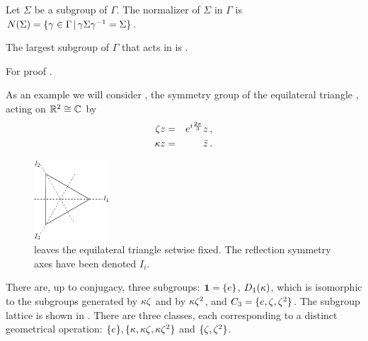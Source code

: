 \begin{definition}
 Let $\Sigma$ be a subgroup of $\Gamma$. The normalizer of $\Sigma$ in $\Gamma$ is 
 $N(\Sigma)=\{\gamma\in\Gamma\, |\, \gamma\Sigma\gamma^{-1}=\Sigma\}$.
\end{definition}

\begin{lemma}
  The largest subgroup of $\Gamma$ that acts in \Fix{\Sigma} is \Nlz{\Sigma}.
\end{lemma}
For proof \cf {}.



\begin{example} %
As an example we will consider , the symmetry group of the equilateral triangle
, acting on $\mathbb{R}^{2}\cong\mathbb{C}^{}$ by
\begin{eqnarray*}
  \zeta z &=& e^{i\frac{2\pi}{3}} z\,,\\
  \kappa z  &=& \bar{z}\,.
	\label{eq:D3onR2}
\end{eqnarray*}

\begin{figure}
\begin{center}
		\includegraphics[width=0.25\textwidth]{../figs/D3triangle}
\end{center}
\caption[D3 symmetry illustration.]{
    {\small
     leaves the equilateral triangle setwise fixed. The reflection symmetry axes have been denoted $I_i$.}}
\label{fig:D3triangle}
    \vspace*{-5pt}
\end{figure}

There are, up to conjugacy, three subgroups: $\mathbf{1}=\{e\}$, $D_1(\kappa)$,
which is isomorphic to the subgroups generated
by $\kappa\zeta$ and by $\kappa\zeta^2$, and $C_{3}=\{e,\zeta,\zeta^2\}$.
The subgroup lattice is shown in .
There are three classes, each corresponding to
a distinct geometrical operation: $\{e\},\{\kappa,\kappa\zeta,\kappa\zeta^2\}$
and $\{\zeta,\zeta^2\}$.


\end{example}


